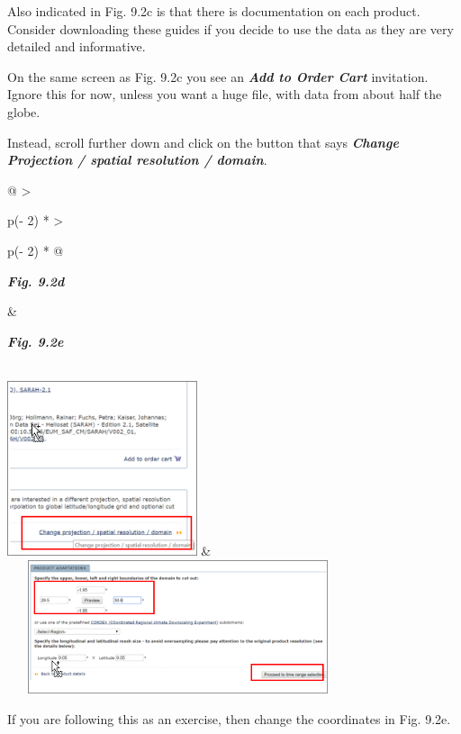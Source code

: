 \documentclass[
  letterpaper,
  DIV=11,
  numbers=noendperiod]{scrreprt}
\begin{document}
Also indicated in Fig. 9.2c is that there is documentation on each
product. Consider downloading these guides if you decide to use the data
as they are very detailed and informative.

On the same screen as Fig. 9.2c you see an \textbf{\emph{Add to Order
Cart}} invitation. Ignore this for now, unless you want a huge file,
with data from about half the globe.

Instead, scroll further down and click on the button that says
\textbf{\emph{Change Projection / spatial resolution / domain}}.

\begin{longtable}[]{@{}
  >{\raggedright\arraybackslash}p{(\columnwidth - 2\tabcolsep) * }
  >{\raggedright\arraybackslash}p{(\columnwidth - 2\tabcolsep) * }@{}}
\toprule\noalign{}
\begin{minipage}[b]{\linewidth}\raggedright
\textbf{\emph{Fig. 9.2d}}
\end{minipage} & \begin{minipage}[b]{\linewidth}\raggedright
\textbf{\emph{Fig. 9.2e}}
\end{minipage} \\
\midrule\noalign{}
\endhead
\bottomrule\noalign{}
\endlastfoot
\includegraphics[width=2.19384in,height=2.02141in]{figures/Fig9.2d.png}
&
\includegraphics[width=3.94052in,height=1.55028in]{figures/Fig9.2e.png} \\
\end{longtable}

If you are following this as an exercise, then change the coordinates in
Fig. 9.2e.
\end{document}
